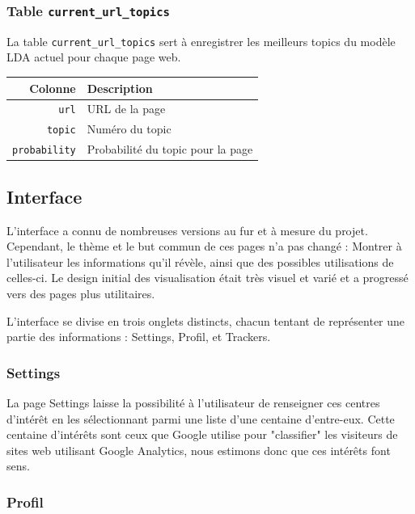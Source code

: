 		\subsubsection{Table \texttt{current\_url\_topics}}\label{table-current-url-topics}
			La table \texttt{current\_url\_topics} sert à enregistrer les meilleurs topics du modèle LDA actuel pour chaque page web.

			\begin{tabular}{rl}
				\textbf{Colonne} & \textbf{Description} \\
				\hline
				\texttt{url} & URL de la page \\
			    \texttt{topic} & Numéro du topic \\
			    \texttt{probability} & Probabilité du topic pour la page \\
			\end{tabular}
		

	\FloatBarrier

	\subsection{Interface}

		L'interface a connu de nombreuses versions au fur et à mesure du projet. Cependant, le thème et le but commun de ces pages n'a pas changé : Montrer à l'utilisateur les informations qu'il révèle, ainsi que des possibles utilisations de celles-ci. Le design initial des visualisation était très visuel et varié et a progressé vers des pages plus utilitaires.

		L'interface se divise en trois onglets distincts, chacun tentant de représenter une partie des informations : Settings, Profil, et Trackers.

		\subsubsection{Settings}

			La page Settings laisse la possibilité à l'utilisateur de renseigner ces centres d'intérêt en les sélectionnant parmi une liste d'une centaine d'entre-eux. Cette centaine d'intérêts sont ceux que Google utilise pour "classifier" les visiteurs de sites web utilisant Google Analytics, nous estimons donc que ces intérêts font sens. 

		\subsubsection{Profil}

